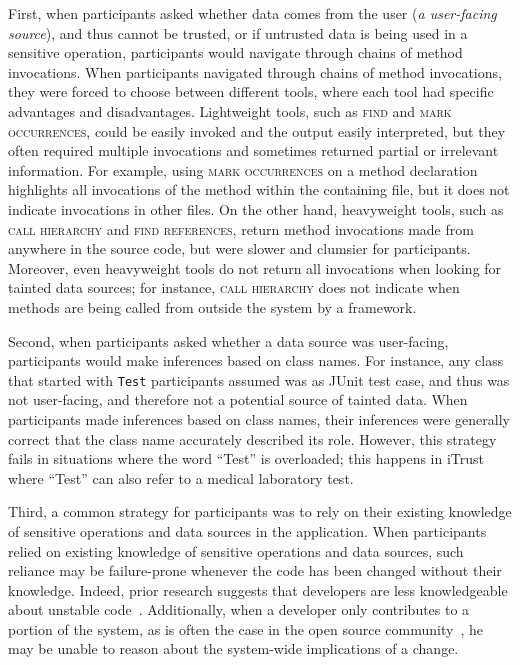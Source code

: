 \documentclass{sig-alternate}
\begin{document}
First, when participants asked whether data comes from the user (\emph{a user-facing source}), 
and thus cannot be trusted, or if untrusted data is being used in a sensitive operation,
participants would navigate through chains of method invocations.
When participants navigated through chains of method invocations,
they were forced to choose between different tools, where each tool
had specific advantages and disadvantages.
Lightweight tools, such as \textsc{find} and \textsc{mark occurrences}, could be easily invoked and the output
easily interpreted, but they often required multiple invocations and sometimes returned 
partial or irrelevant information.
For example, using \textsc{mark occurrences} on a method declaration highlights all invocations of the method 
within the containing file, but it does not indicate invocations in other files.
On the other hand, heavyweight tools, such as \textsc{call hierarchy} and \textsc{find references}, 
return method invocations made from anywhere in the source code, but were slower and clumsier for participants.
Moreover, even heavyweight tools do not return all invocations when looking for tainted data sources;
for instance, \textsc{call hierarchy} does not indicate when methods are being called from outside the system
by a framework.

Second, when participants asked whether a data source was user-facing,
participants would make inferences based on class names.
For instance, any class that started with \texttt{Test} participants assumed was as JUnit test case,
and thus was not user-facing, and therefore not a potential source of tainted data.
When participants made inferences based on class names,
their inferences were generally correct that the class name accurately described
its role.
However, this strategy
fails in situations where the word ``Test'' is overloaded;
this happens in iTrust where ``Test'' can also refer to 
a medical laboratory test.

Third, a common strategy for
participants was to rely on their existing knowledge of sensitive operations and data sources in the application.
When participants relied on existing knowledge of sensitive operations and data sources,
such reliance may be failure-prone whenever the code has been changed without their knowledge.
Indeed, prior research suggests that developers are 
less knowledgeable about unstable code~\cite{fritz2014degree}. 
Additionally, when a developer only contributes to a portion of the system, as is often the case in the open source community~\cite{mockus2002open}, he may be unable to reason about the system-wide implications of a change. 
\end{document}

